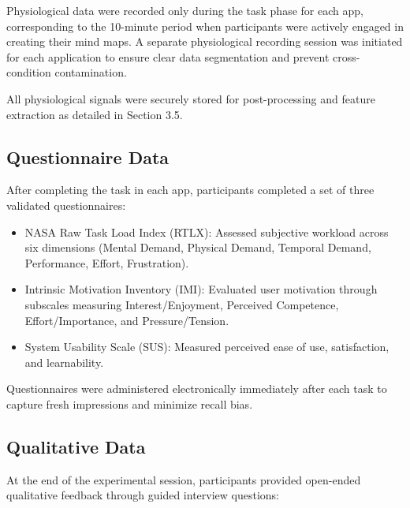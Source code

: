 \documentclass{CPP}
\begin{document}
Physiological data were recorded only during the task phase for each app, corresponding to the 10-minute period when participants were actively engaged in creating their mind maps. A separate physiological recording session was initiated for each application to ensure clear data segmentation and prevent cross-condition contamination.

All physiological signals were securely stored for post-processing and feature extraction as detailed in Section 3.5.

\subsection{Questionnaire Data}

After completing the task in each app, participants completed a set of three validated questionnaires:

\begin{itemize}
    \item NASA Raw Task Load Index (RTLX): Assessed subjective workload across six dimensions (Mental Demand, Physical Demand, Temporal Demand, Performance, Effort, Frustration).
    \item Intrinsic Motivation Inventory (IMI): Evaluated user motivation through subscales measuring Interest/Enjoyment, Perceived Competence, Effort/Importance, and Pressure/Tension. 
    \item System Usability Scale (SUS): Measured perceived ease of use, satisfaction, and learnability.
\end{itemize}

Questionnaires were administered electronically immediately after each task to capture fresh impressions and minimize recall bias.

\subsection{Qualitative Data}

At the end of the experimental session, participants provided open-ended qualitative feedback through guided interview questions:
\end{document}
